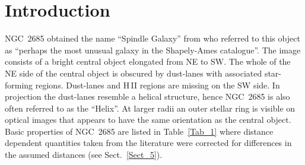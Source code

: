 \documentclass[oldversion]{aa}
\begin{document}
   \maketitle
%
\section{Introduction}
\label{Sect_3.1}
NGC~2685 obtained the name ``Spindle Galaxy'' from
\citet[][]{Sandage61} who referred to this object as ``perhaps the
most unusual galaxy in the Shapely-Ames catalogue''. The image
consists of a bright central object elongated from NE to SW. The whole
of the NE side of the central object is obscured by dust-lanes with
associated star-forming regions. Dust-lanes and {H\,{\small II}}
regions are missing on the SW side. In projection the dust-lanes
resemble a helical structure, hence NGC~2685 is also often referred to
as the ``Helix''. At larger radii an outer stellar ring is visible on
optical images that appears to have the same orientation as the
central object. Basic properties of NGC~2685 are
listed in Table~\ref{Tab_1} where distance dependent quantities
taken from the literature were corrected for differences in the
assumed distances (see Sect.~\ref{Sect_5}).
\end{document}
